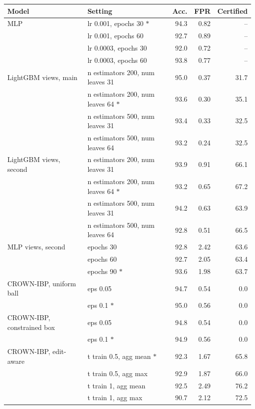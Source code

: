 \begin{tabular}{llrrr}
\toprule
Model & Setting & Acc. & FPR & Certified \\
\midrule
MLP & lr 0.001, epochs 30 $\ast$ & 94.3 & 0.82 & -- \\
 & lr 0.001, epochs 60 & 92.7 & 0.89 & -- \\
 & lr 0.0003, epochs 30 & 92.0 & 0.72 & -- \\
 & lr 0.0003, epochs 60 & 93.8 & 0.77 & -- \\
\addlinespace
LightGBM views, main & n estimators 200, num leaves 31 & 95.0 & 0.37 & 31.7 \\
 & n estimators 200, num leaves 64 $\ast$ & 93.6 & 0.30 & 35.1 \\
 & n estimators 500, num leaves 31 & 93.4 & 0.33 & 32.5 \\
 & n estimators 500, num leaves 64 & 93.2 & 0.24 & 32.5 \\
\addlinespace
LightGBM views, second & n estimators 200, num leaves 31 & 93.9 & 0.91 & 66.1 \\
 & n estimators 200, num leaves 64 $\ast$ & 93.2 & 0.65 & 67.2 \\
 & n estimators 500, num leaves 31 & 94.2 & 0.63 & 63.9 \\
 & n estimators 500, num leaves 64 & 92.8 & 0.51 & 66.5 \\
\addlinespace
MLP views, second & epochs 30 & 92.8 & 2.42 & 63.6 \\
 & epochs 60 & 92.7 & 2.05 & 63.4 \\
 & epochs 90 $\ast$ & 93.6 & 1.98 & 63.7 \\
\addlinespace
CROWN-IBP, uniform ball & eps 0.05 & 94.7 & 0.54 & 0.0 \\
 & eps 0.1 $\ast$ & 95.0 & 0.56 & 0.0 \\
\addlinespace
CROWN-IBP, constrained box & eps 0.05 & 94.8 & 0.54 & 0.0 \\
 & eps 0.1 $\ast$ & 94.9 & 0.56 & 0.0 \\
\addlinespace
CROWN-IBP, edit-aware & t train 0.5, agg mean $\ast$ & 92.3 & 1.67 & 65.8 \\
 & t train 0.5, agg max & 92.9 & 1.87 & 66.0 \\
 & t train 1, agg mean & 92.5 & 2.49 & 76.2 \\
 & t train 1, agg max & 90.7 & 2.12 & 72.5 \\
\bottomrule
\end{tabular}
